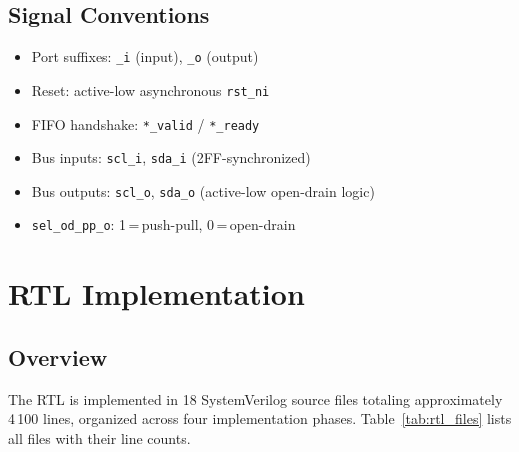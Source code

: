 \documentclass[12pt, a4paper, oneside]{report}
\newcommand{\signal}[1]{\texttt{#1}}
\begin{document}
\section{Signal Conventions}

\begin{itemize}
  \item Port suffixes: \signal{\_i} (input), \signal{\_o} (output)
  \item Reset: active-low asynchronous \signal{rst\_ni}
  \item FIFO handshake: \signal{*\_valid} / \signal{*\_ready}
  \item Bus inputs: \signal{scl\_i}, \signal{sda\_i} (2FF-synchronized)
  \item Bus outputs: \signal{scl\_o}, \signal{sda\_o} (active-low open-drain logic)
  \item \signal{sel\_od\_pp\_o}: 1\,=\,push-pull, 0\,=\,open-drain
\end{itemize}

\chapter{RTL Implementation}

\section{Overview}

The RTL is implemented in 18 SystemVerilog source files totaling approximately 4\,100
lines, organized across four implementation phases. Table~\ref{tab:rtl_files} lists
all files with their line counts.
\end{document}
